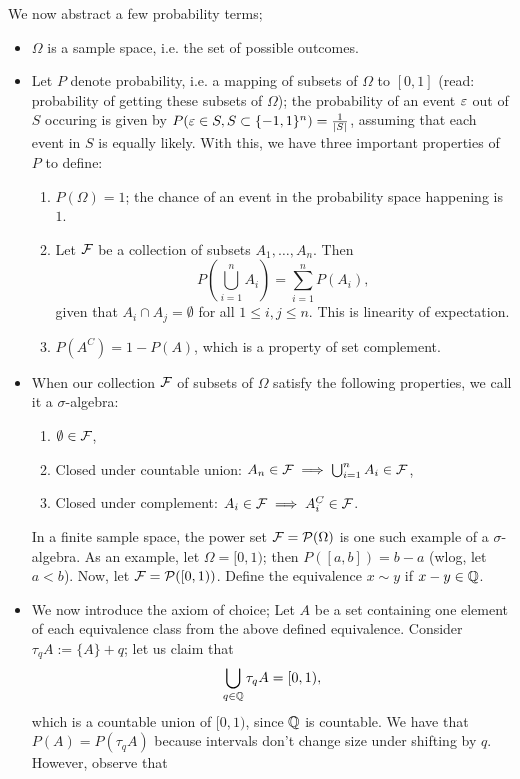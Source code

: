 \newpage
\noindent We now abstract a few probability terms;
\begin{itemize}
    \item $\Omega$ is a sample space, i.e. the set of possible outcomes.
    \item Let $P$ denote probability, i.e. a mapping of subsets of $\Omega$ to $[0, 1]$ (read: probability of getting these subsets of $\Omega$); the probability of an event $\varepsilon$ out of $S$ occuring is given by $P(\varepsilon \in S, S \subset \{-1, 1\}^n) = \frac{1}{\left\lvert S \right\rvert}$, assuming that each event in $S$ is equally likely. With this, we have three important properties of $P$ to define:
    \begin{enumerate}
        \item $P(\Omega) = 1$; the chance of an event in the probability space happening is $1$.
        \item Let $\mathcal F$ be a collection of subsets $A_1, \dots, A_n$. Then
        \[ P\left( \bigcup_{i=1}^n A_i \right) = \sum_{i=1}^n P(A_i), \]
        given that $A_i \cap A_j = \emptyset$ for all $1 \leq i, j \leq n$. This is linearity of expectation.
        \item $P(A^C) = 1 - P(A)$, which is a property of set complement. 
    \end{enumerate}
    \item When our collection $\mathcal F$ of subsets of $\Omega$ satisfy the following properties, we call it a $\sigma$-algebra:
    \begin{enumerate}
        \item $\emptyset \in \mathcal F$,
        \item Closed under countable union: $A_n \in \mathcal F \implies \bigcup_{i=1}^n A_i \in \mathcal F$,
        \item Closed under complement: $A_i \in \mathcal F \implies A_i^C \in \mathcal F$.
    \end{enumerate}
    In a finite sample space, the power set $\mathcal F = \mathcal P(\Omega)$ is one such example of a $\sigma$-algebra. As an example, let $\Omega = [0, 1)$; then $P([a, b]) = b - a$ (wlog, let $a < b$). Now, let $\mathcal F = \mathcal P([0, 1))$. Define the equivalence $x \sim y$ if $x - y \in \mathbb Q$.
    \item We now introduce the axiom of choice; Let $A$ be a set containing one element of each equivalence class from the above defined equivalence. Consider $\tau_q A := \{A\} + q$; let us claim that
    \[ \bigcup_{q \in \mathbb Q} \tau_q A = [0, 1), \]
    which is a countable union of $[0, 1)$, since $\mathbb Q$ is countable. We have that $P(A) = P(\tau_q A)$ because intervals don't change size under shifting by $q$. However, observe that

\end{itemize}
